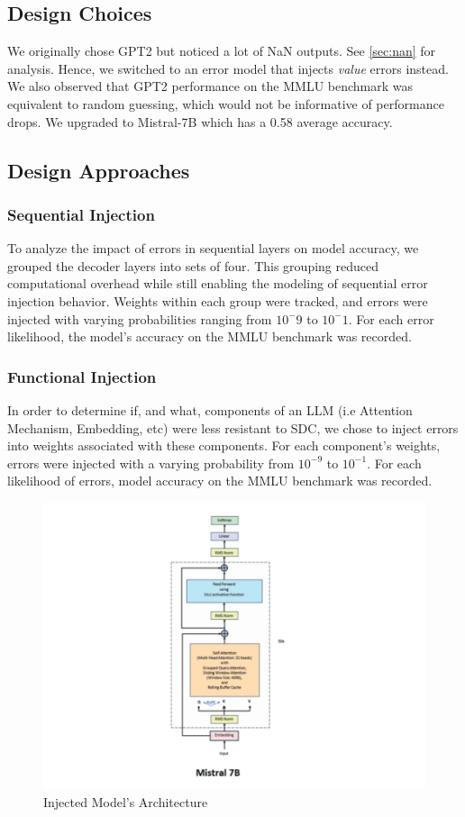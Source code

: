 \subsection{Design Choices}
We originally chose GPT2 but noticed a lot of NaN outputs. See \ref{sec:nan} for analysis. Hence, we switched to an error model that injects \textit{value} errors instead. \\

We also observed that GPT2 performance on the MMLU benchmark was equivalent to random guessing, which would not be informative of performance drops. We upgraded to Mistral-7B which has a 0.58 average accuracy.

\subsection{Design Approaches}
\subsubsection{Sequential Injection} 
To analyze the impact of errors in sequential layers on model accuracy, we grouped the decoder layers into sets of four. This grouping reduced computational overhead while still enabling the modeling of sequential error injection behavior. Weights within each group were tracked, and errors were injected with varying probabilities ranging from $10^-9$ to $10^-1$. For each error likelihood, the model’s accuracy on the MMLU benchmark was recorded.

\subsubsection{Functional Injection} 
In order to determine if, and what, components of an LLM (i.e Attention Mechanism, Embedding, etc) were less resistant to SDC, we chose to inject errors into weights associated with these components. For each component's weights, errors were injected with a varying probability from $10^{-9}$ to $10^{-1}$. For each likelihood of errors, model accuracy on the MMLU benchmark was recorded.

\begin{figure}[!htbp]
    \centering
    \includegraphics[width=1\linewidth]{images/Mistral-7B-Arch.png}
    \caption{Injected Model's Architecture}
    \label{fig:enter-label}
\end{figure}